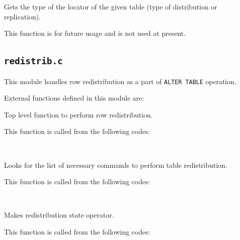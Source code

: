   
      Gets the type of the locator of the given table (type of distribution or replication).
      
      This function is for future usage and is not used at present.
      


\subsection{\texttt{redistrib.c}}
      
  This module handles row redistribution as a part of \texttt{ALTER TABLE}
  operation.
  
  External functions defined in this module are:
  
  
      Top level function to perform row redistribution.
      
      This function is called from the following codes:
      
      \FuncRefHdr
		  \\ \hline
      \FuncRefTrailor
  
  
      Looks for the list of necessary commands to perform table
      redistribution.
      
      This function is called from the following codes:
      
      \FuncRefHdr
		  \\ \hline
      \FuncRefTrailor
  
  
      Makes redistribution state operator.
      
      This function is called from the following codes:
      
      \FuncRefHdr
		  \\ \hline
      \FuncRefTrailor
  
